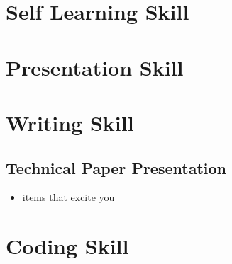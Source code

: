 \documentclass[]{article}
\title{}
\author{Russ Seaman}
\begin{document}
\maketitle
\tableofcontents

\begin{abstract}

\end{abstract}

\section{Self Learning Skill}

\section{Presentation Skill}

\section{Writing Skill}
\subsection{Technical Paper Presentation}
\begin{itemize}
	\item items that excite you
\end{itemize}
\section{Coding Skill}
\end{document}
